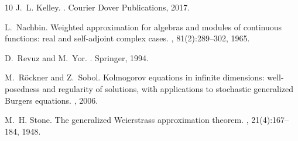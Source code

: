 \documentclass[a4paper,12pt]{article}
\theoremstyle{definition}
\theoremstyle{remark}
\numberwithin{equation}{section}
\numberwithin{theorem}{section}
\begin{document}
\begin{thebibliography}{10}
J.~L. Kelley.
.
\newblock Courier Dover Publications, 2017.

L.~Nachbin.
\newblock Weighted approximation for algebras and modules of continuous
  functions: real and self-adjoint complex cases.
, 81(2):289--302, 1965.

D.~Revuz and M.~Yor.
.
\newblock Springer, 1994.

M.~R{\"o}ckner and Z.~Sobol.
\newblock Kolmogorov equations in infinite dimensions: well-posedness and
  regularity of solutions, with applications to stochastic generalized
  {B}urgers equations.
, 2006.

M.~H. {Stone}.
\newblock The generalized {Weierstrass} approximation theorem.
, 21(4):167--184, 1948.

\end{thebibliography}
\end{document}
